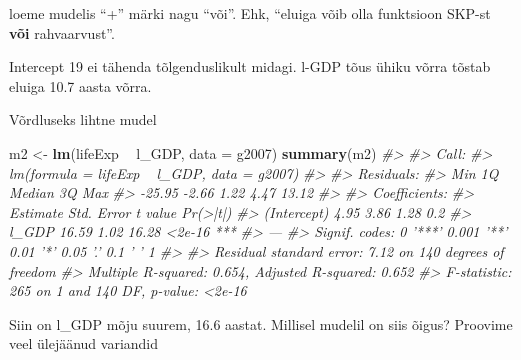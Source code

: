 \documentclass[]{book}
\newenvironment{Shaded}{\begin{snugshade}}{\end{snugshade}}
\newcommand{\CommentTok}[1]{\textcolor[rgb]{0.56,0.35,0.01}{\textit{#1}}}
\newcommand{\DataTypeTok}[1]{\textcolor[rgb]{0.13,0.29,0.53}{#1}}
\newcommand{\KeywordTok}[1]{\textcolor[rgb]{0.13,0.29,0.53}{\textbf{#1}}}
\newcommand{\NormalTok}[1]{#1}
\newcommand{\OperatorTok}[1]{\textcolor[rgb]{0.81,0.36,0.00}{\textbf{#1}}}
\newcommand{\StringTok}[1]{\textcolor[rgb]{0.31,0.60,0.02}{#1}}
\begin{document}
loeme mudelis ``+'' märki nagu ``või''. Ehk, ``eluiga võib olla funktsioon SKP-st \textbf{või} rahvaarvust''.

Intercept 19 ei tähenda tõlgenduslikult midagi. l-GDP tõus ühiku võrra tõstab eluiga 10.7 aasta võrra.

Võrdluseks lihtne mudel

\begin{Shaded}
\begin{Highlighting}[]
\NormalTok{m2 <-}\StringTok{ }\KeywordTok{lm}\NormalTok{(lifeExp }\OperatorTok{~}\StringTok{ }\NormalTok{l_GDP, }\DataTypeTok{data =}\NormalTok{ g2007)}
\KeywordTok{summary}\NormalTok{(m2)}
\CommentTok{#> }
\CommentTok{#> Call:}
\CommentTok{#> lm(formula = lifeExp ~ l_GDP, data = g2007)}
\CommentTok{#> }
\CommentTok{#> Residuals:}
\CommentTok{#>    Min     1Q Median     3Q    Max }
\CommentTok{#> -25.95  -2.66   1.22   4.47  13.12 }
\CommentTok{#> }
\CommentTok{#> Coefficients:}
\CommentTok{#>             Estimate Std. Error t value Pr(>|t|)    }
\CommentTok{#> (Intercept)     4.95       3.86    1.28      0.2    }
\CommentTok{#> l_GDP          16.59       1.02   16.28   <2e-16 ***}
\CommentTok{#> ---}
\CommentTok{#> Signif. codes:  0 '***' 0.001 '**' 0.01 '*' 0.05 '.' 0.1 ' ' 1}
\CommentTok{#> }
\CommentTok{#> Residual standard error: 7.12 on 140 degrees of freedom}
\CommentTok{#> Multiple R-squared:  0.654,  Adjusted R-squared:  0.652 }
\CommentTok{#> F-statistic:  265 on 1 and 140 DF,  p-value: <2e-16}
\end{Highlighting}
\end{Shaded}

Siin on l\_GDP mõju suurem, 16.6 aastat. Millisel mudelil on siis õigus? Proovime veel ülejäänud variandid
\end{document}
